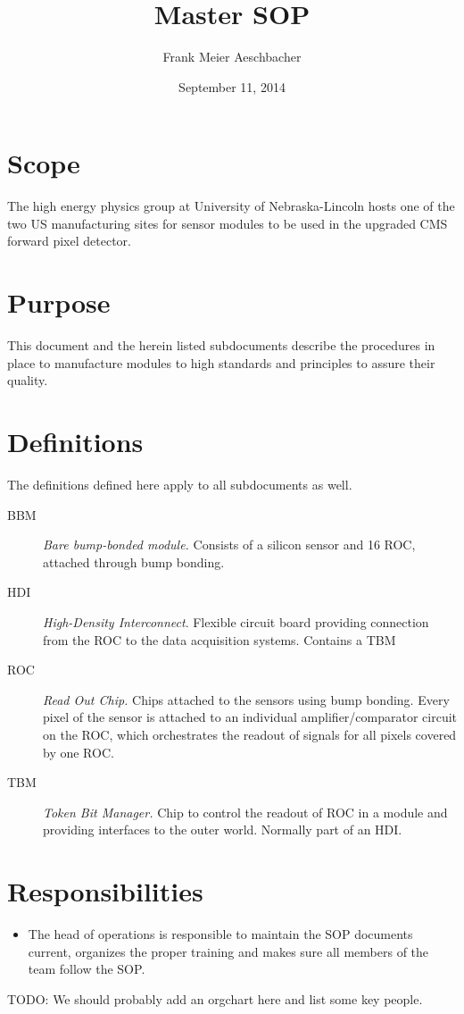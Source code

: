 \documentclass[12pt]{unlsilabsop}
\title{Master SOP}
\date{September 11, 2014}
\author{Frank Meier Aeschbacher}
\begin{document}
\maketitle

\section{Scope}
The high energy physics group at University of Nebraska-Lincoln hosts one of the two US manufacturing sites for sensor modules to be used in the upgraded CMS forward pixel detector. 

\section{Purpose}
This document and the herein listed subdocuments describe the procedures in place to manufacture modules to high standards and principles to assure their quality.

\section{Definitions}
The definitions defined here apply to all subdocuments as well.
\begin{description}
    \item[BBM] \emph{Bare bump-bonded module.} Consists of a silicon sensor and 16 ROC, attached through bump bonding.
    \item[HDI] \emph{High-Density Interconnect}. Flexible circuit board providing connection from the ROC to the data acquisition systems. Contains a TBM
    \item[ROC] \emph{Read Out Chip.} Chips attached to the sensors using bump bonding. Every pixel of the sensor is attached to an individual amplifier/comparator circuit on the ROC, which orchestrates the readout of signals for all pixels covered by one ROC.
    \item[TBM] \emph{Token Bit Manager.} Chip to control the readout of ROC in a module and providing interfaces to the outer world. Normally part of an HDI.
\end{description}

\section{Responsibilities}
\begin{itemize}
    \item The head of operations is responsible to maintain the SOP documents current, organizes the proper training and makes sure all members of the team follow the SOP.
\end{itemize}
TODO: We should probably add an orgchart here and list some key people.
\end{document}
